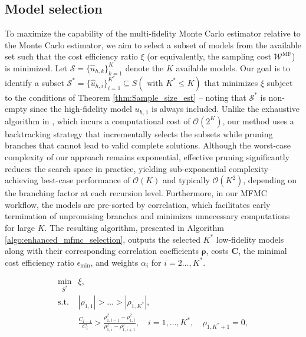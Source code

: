 \subsection{Model selection}
To maximize the capability of the multi-fidelity Monte Carlo estimator relative to the Monte Carlo estimator, we aim to select a subset of models from the available set such that the cost efficiency ratio $\xi$ (or equivalently, the sampling cost $\mathcal{W}^\text{MF}$) is minimized. Let $\mathcal{S}=\{\widehat u_{h, k}\}_{k=1}^K$ denote the $K$ available models. Our goal is to identify a subset  $\mathcal{S}^*=\{ \widehat u_{h, i}\}_{i=1}^{K^*} \subseteq S ( \text{ with } K^*\le K)$ that minimizes $\xi$  subject to the conditions of Theorem \ref{thm:Sample_size_est} -- noting that $\mathcal{S}^*$ is non-empty since the high-fidelity model $u_{h,1}$ is always included. Unlike the exhaustive algorithm in \cite[Algorithm~1]{PeWiGu:2016}, which incurs a computational cost of $\mathcal{O}(2^K)$, our method uses a backtracking strategy that incrementally selects the subsets while pruning branches that cannot lead to valid complete solutions. Although the worst-case complexity of our approach remains exponential, effective pruning significantly reduces the search space in practice, yielding sub-exponential complexity--achieving best-case performance of $\mathcal{O}(K)$ and typically $\mathcal{O}(K^2)$, depending on the branching factor at each recursion level. Furthermore, in our MFMC workflow, the models are pre-sorted by correlation, which facilitates early termination of unpromising branches and minimizes unnecessary computations for large $K$. The resulting algorithm, presented in Algorithm \ref{algo:enhanced_mfmc_selection}, outputs the selected $K^*$ low-fidelity models along with their corresponding correlation coefficients $\boldsymbol{\rho}$, costs $\boldsymbol{C}$, the minimal cost efficiency ratio $\epsilon_{\text{min}}$, and weights $\alpha_i$ for $i=2\ldots, K^*$. 

\begin{equation*}\label{eq:Optimization_pb_model_selection}
    \begin{array}{lll}
    \displaystyle\min_{S^*} &\displaystyle \xi,\\
       \text{s.t.} &\displaystyle |\rho_{1,1}|>\ldots>|\rho_{1,K^*}|,\\
       &\displaystyle \frac{C_{i-1}}{C_i}>\frac{\rho_{1,i-1}^2-\rho_{1,i}^2}{\rho_{1,i}^2-\rho_{1,i+1}^2}, \quad i=1,\ldots,{K^*}, \quad \rho_{1,K^*+1}=0,\\
    \end{array}
\end{equation*}


